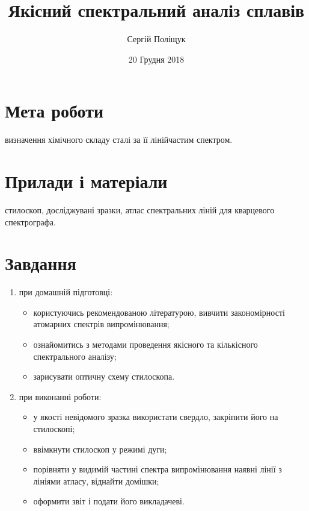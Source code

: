 \documentclass[twocolumn]{el-author}
\date{20 Грудня 2018}
\begin{document}
\title{Якісний спектральний аналіз сплавів}

\author{Сергій Поліщук}


\maketitle

\section{Мета роботи}

визначення хімічного складу сталі за її лінійчастим спектром.

\section{Прилади і матеріали}

 стилоскоп, досліджувані зразки, атлас спектральних
ліній для кварцевого спектрографа.

\section{Завдання}

\begin{enumerate}
	\item при домашній підготовці:
	\begin{itemize}
		\item  користуючись рекомендованою літературою, вивчити
закономірності атомарних спектрів випромінювання;
		\item  ознайомитись з методами проведення якісного та кількісного
спектрального аналізу;
		\item  зарисувати оптичну схему стилоскопа.
	\end{itemize}
	\item при виконанні роботи:
	\begin{itemize}
		\item  у якості невідомого зразка використати свердло, закріпити
його на стилоскопі;
		\item  ввімкнути стилоскоп у режимі дуги;
		\item  порівняти у видимій частині спектра випромінювання наявні
лінії з лініями атласу, віднайти домішки;
		\item  оформити звіт і подати його викладачеві.
	\end{itemize}
	
\end{enumerate}
\end{document}
